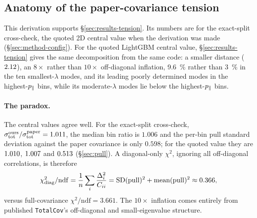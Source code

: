 \subsection{Anatomy of the paper-covariance tension}
\label{sec:tension}

This derivation supports \S\ref{sec:results-tension}. Its numbers are for the exact-split cross-check, the quoted 2D central value when the derivation was made (\S\ref{sec:method-config}). For the quoted LightGBM central value, \S\ref{sec:results-tension} gives the same decomposition from the same code: a smaller distance ($2.12$), an $8\times$ rather than $10\times$ off-diagonal inflation, \SI{9.6}{\percent} rather than \SI{3}{\percent} in the ten smallest-$\lambda$ modes, and its leading poorly determined modes in the highest-$p_{\parallel}$ bins, while its moderate-$\lambda$ modes lie below the highest-$p_{\parallel}$ bins.

\paragraph{The paradox.} The central values agree well. For the exact-split cross-check, $\sigma_{\text{tot}}^{\text{ours}}/\sigma_{\text{tot}}^{\text{paper}} = 1.011$, the median bin ratio is $1.006$ and the per-bin pull standard deviation against the paper covariance is only $0.598$; for the quoted value they are $1.010$, $1.007$ and $0.513$ (\S\ref{sec:pull}). A diagonal-only $\chi^{2}$, ignoring all off-diagonal correlations, is therefore %
\begin{equation}
\chi^{2}_{\mathrm{diag}}/\mathrm{ndf}
= \frac{1}{n}\sum_{i}\frac{\Delta_{i}^{2}}{C_{ii}}
= \mathrm{SD}(\mathrm{pull})^{2} + \mathrm{mean}(\mathrm{pull})^{2}
\approx 0.366,
\end{equation}
versus full-covariance $\chi^{2}/\mathrm{ndf}=3.661$. The $10\times$ inflation comes entirely from published \texttt{TotalCov}'s off-diagonal and small-eigenvalue structure.

